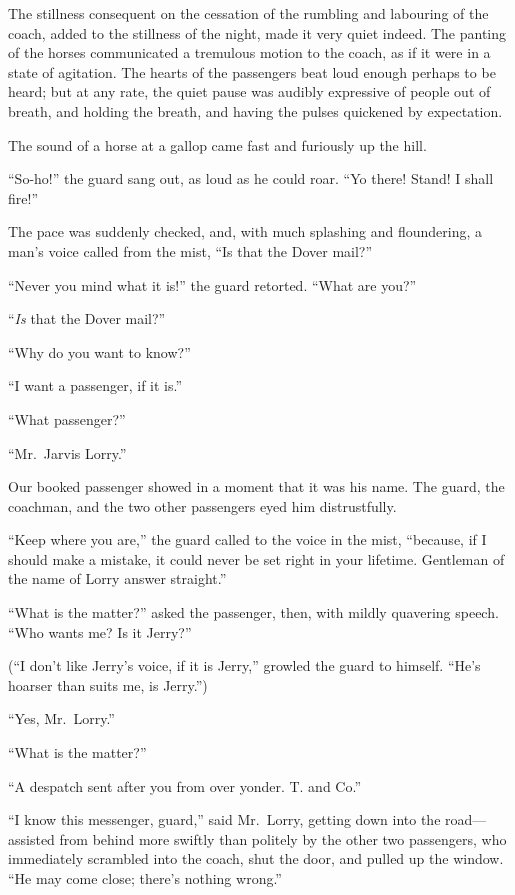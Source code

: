 The stillness consequent on the cessation of the rumbling and
labouring of the coach, added to the stillness of the night, made
it very quiet indeed.  The panting of the horses communicated a
tremulous motion to the coach, as if it were in a state of
agitation.  The hearts of the passengers beat loud enough perhaps
to be heard; but at any rate, the quiet pause was audibly
expressive of people out of breath, and holding the breath, and
having the pulses quickened by expectation.

The sound of a horse at a gallop came fast and furiously up the hill.

``So-ho!'' the guard sang out, as loud as he could roar.  ``Yo there!
Stand!  I shall fire!''

The pace was suddenly checked, and, with much splashing and floundering,
a man's voice called from the mist, ``Is that the Dover mail?''

``Never you mind what it is!'' the guard retorted.  ``What are you?''

``\emph{Is} that the Dover mail?''

``Why do you want to know?''

``I want a passenger, if it is.''

``What passenger?''

``Mr.\ Jarvis Lorry.''

Our booked passenger showed in a moment that it was his name.
The guard, the coachman, and the two other passengers eyed him
distrustfully.

``Keep where you are,'' the guard called to the voice in the mist,
``because, if I should make a mistake, it could never be set right
in your lifetime.  Gentleman of the name of Lorry answer straight.''

``What is the matter?'' asked the passenger, then, with mildly
quavering speech.  ``Who wants me?  Is it Jerry?''

(``I don't like Jerry's voice, if it is Jerry,'' growled the guard
to himself.  ``He's hoarser than suits me, is Jerry.'')

``Yes, Mr.\ Lorry.''

``What is the matter?''

``A despatch sent after you from over yonder.  T. and Co.''

``I know this messenger, guard,'' said Mr.\ Lorry, getting down into
the road---assisted from behind more swiftly than politely by the
other two passengers, who immediately scrambled into the coach,
shut the door, and pulled up the window.  ``He may come close;
there's nothing wrong.''

